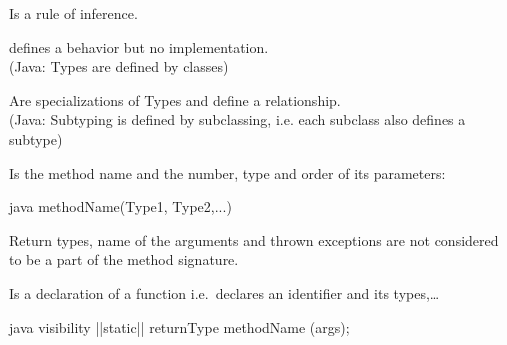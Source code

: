 \begin{defnbox}\nospacing
  \begin{defn}[Resolution]
    Is a rule of inference.
  \end{defn}
\end{defnbox}
\begin{defnbox}\nospacing
  \begin{defn}[Type]\label{defn:Type}
    defines a behavior but no implementation.\\
    (Java: Types are defined by classes)
  \end{defn}
\end{defnbox}
\begin{defnbox}\nospacing
  \begin{defn}[Subtyping]\label{defn:}
    Are specializations of Types and define a  relationship.\\
    (Java: Subtyping is defined by subclassing, i.e. each subclass also defines a subtype)
  \end{defn}
\end{defnbox}
\begin{defnbox}\nospacing
  \begin{defn}\label{defn:}
    Is the method name and the number, type and order of its parameters:
    \begin{mintlinebox}{java}
      methodName(Type1, Type2,...)
    \end{mintlinebox}
  \end{defn}
\end{defnbox}
\begin{notebox}[Note]\nospacing
  Return types, name of the arguments and thrown exceptions are not considered to be a part of the method signature. 
\end{notebox}
\begin{defnbox}\nospacing
  \begin{defn}\label{defn:methodDeclaration}
  Is a declaration of a function i.e.\ declares an identifier and its types,\ldots
    \begin{mintlinebox}{java}
      visibility |\optal|static|\optar| returnType methodName (args);
    \end{mintlinebox}
  \end{defn}
\end{defnbox}
